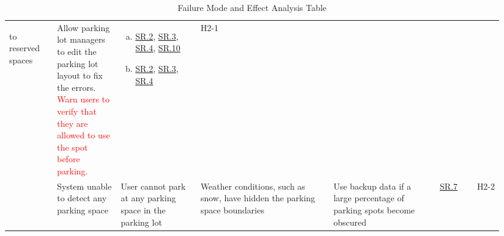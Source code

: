 \documentclass[12pt,letterpaper]{article}
\begin{document}
\begin{landscape}
\begin{table}[hp]
\begin{tabular}{|p{0.09\linewidth}|p{0.12\linewidth}|p{0.15\linewidth}|p{0.25\linewidth}|p{0.2\linewidth}|p{0.075\linewidth}|p{0.05\linewidth}|}
\begin{enumerate}[a., leftmargin=0.5cm, noitemsep,
nolistsep]
to reserved spaces \end{enumerate} & Allow parking lot managers to edit the
parking lot layout to fix the errors. \textcolor{red}{Warn users to verify that
they are allowed to use the spot before parking.} &  \begin{enumerate}[a.,
leftmargin=0.5cm, noitemsep, nolistsep]\item \hyperref[asr2]{SR.2},
\hyperref[asr3]{SR.3}, \hyperref[isr4]{SR.4}, \hyperref[isr10]{SR.10} \item
\hyperref[asr2]{SR.2}, \hyperref[asr3]{SR.3},
\hyperref[isr4]{SR.4}\end{enumerate}& H2-1\\\cline{2-7} & System unable to
detect any parking space & User cannot park at any parking space in the parking
lot & Weather conditions, such as snow, have hidden the parking space boundaries
& Use backup data if a large percentage of parking spots become obscured &
\hyperref[isr7]{SR.7} & H2-2\\
\hline
\end{tabular}
\caption{Failure Mode and Effect Analysis Table} \label{TblFMEA}
\end{table}


\end{landscape}
\end{document}

